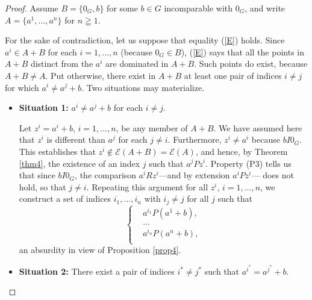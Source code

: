 \documentclass[pdflatex,sn-apa,11pt]{sn-jnl}%
\begin{document}
\begin{proof}
Assume $B = \{0_{G}, b\}$ for some $b \in G$ incomparable with $0_{G}$, and write $A = \{a^1, ..., a^n\}$ for $n \geqq 1$. %

For the sake of contradiction, let us suppose that equality (\ref{E}) holds. Since $a^i \in A+B$ for each $i = 1, ..., n$ (because $0_{G} \in B$), (\ref{E}) says that all the points in $A+B$ distinct from the $a^i$ are dominated in $A+B$. Such points do exist, because $A+B \neq A$. 
Put otherwise, there exist in $A+B$ at least one pair of indices $i \neq j$ for which $a^{i} \neq a^{j} + b$. Two situations may materialize. %

\begin{itemize}
\item{\textbf{Situation 1:}} $a^{i} \neq a^{j} + b$ for each $i \neq j$. 

Let $z^{i} = a^{i} + b$, $i = 1, ..., n$, be any member of $A+B$. We have assumed here that $z^{i}$ is different than $a^{j}$ for each $j \neq i$. Furthermore, $z^{i} \neq a^{i}$ because $bI0_{G}$. This establishes that $z^{i} \notin \mathscr{E}(A+B) = \mathscr{E}(A)$, and hence, by Theorem \ref{thm4}, the existence of an index $j$ such that $a^{j}Pz^{i}$. Property (P3) tells us that since $bI0_{G}$, the comparison $a^{i}Rz^{i}$---and by extension $a^{i}Pz^{i}$--- does not hold, so that $j \neq i$. Repeating this argument for all $z^{i}$, $i = 1, ..., n$, we construct a set of indices $i_1, ..., i_n$ with $i_j \neq j$ for all $j$ such that 
\begin{equation*}
  \left\{
    \begin{aligned}
      & a^{i_1}P(a^{1} + b), \\
      & \dots \\
      & a^{i_{n}}P(a^{n} + b), \\
    \end{aligned}
  \right.
\end{equation*} 
an absurdity in view of Proposition \ref{prop4}.
\item{\textbf{Situation 2:}} There exist a pair of indices $i^{*} \neq j^{*}$ such that $a^{i^{*}} = a^{j^{*}} + b$.


\end{itemize}
\end{proof}
\end{document}
